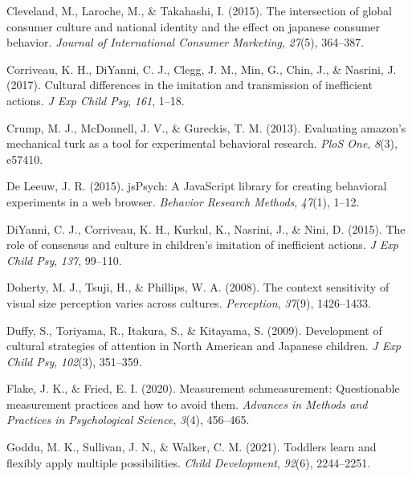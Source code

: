 \documentclass[
  man,floatsintext]{apa6}
\newlength{\cslhangindent}
\newlength{\cslentryspacingunit} %
\newenvironment{CSLReferences}[2] %
 {%
  \setlength{\parindent}{0pt}
  \ifodd #1
  \let\oldpar\par
  \def\par{\hangindent=\cslhangindent\oldpar}
  \fi
  \setlength{\parskip}{#2\cslentryspacingunit}
 }%
 {}
\begin{document}
\begin{CSLReferences}{1}{0}
\leavevmode{}%
Cleveland, M., Laroche, M., \& Takahashi, I. (2015). The intersection of global consumer culture and national identity and the effect on japanese consumer behavior. \emph{Journal of International Consumer Marketing}, \emph{27}(5), 364--387.

\leavevmode{}%
Corriveau, K. H., DiYanni, C. J., Clegg, J. M., Min, G., Chin, J., \& Nasrini, J. (2017). Cultural differences in the imitation and transmission of inefficient actions. \emph{J Exp Child Psy}, \emph{161}, 1--18.

\leavevmode{}%
Crump, M. J., McDonnell, J. V., \& Gureckis, T. M. (2013). Evaluating amazon's mechanical turk as a tool for experimental behavioral research. \emph{PloS One}, \emph{8}(3), e57410.

\leavevmode{}%
De Leeuw, J. R. (2015). jsPsych: A JavaScript library for creating behavioral experiments in a web browser. \emph{Behavior Research Methods}, \emph{47}(1), 1--12.

\leavevmode{}%
DiYanni, C. J., Corriveau, K. H., Kurkul, K., Nasrini, J., \& Nini, D. (2015). The role of consensus and culture in children's imitation of inefficient actions. \emph{J Exp Child Psy}, \emph{137}, 99--110.

\leavevmode{}%
Doherty, M. J., Tsuji, H., \& Phillips, W. A. (2008). The context sensitivity of visual size perception varies across cultures. \emph{Perception}, \emph{37}(9), 1426--1433.

\leavevmode{}%
Duffy, S., Toriyama, R., Itakura, S., \& Kitayama, S. (2009). Development of cultural strategies of attention in {N}orth {A}merican and {J}apanese children. \emph{J Exp Child Psy}, \emph{102}(3), 351--359.

\leavevmode{}%
Flake, J. K., \& Fried, E. I. (2020). Measurement schmeasurement: Questionable measurement practices and how to avoid them. \emph{Advances in Methods and Practices in Psychological Science}, \emph{3}(4), 456--465.

\leavevmode{}%
Goddu, M. K., Sullivan, J. N., \& Walker, C. M. (2021). Toddlers learn and flexibly apply multiple possibilities. \emph{Child Development}, \emph{92}(6), 2244--2251.


\end{CSLReferences}
\end{document}

